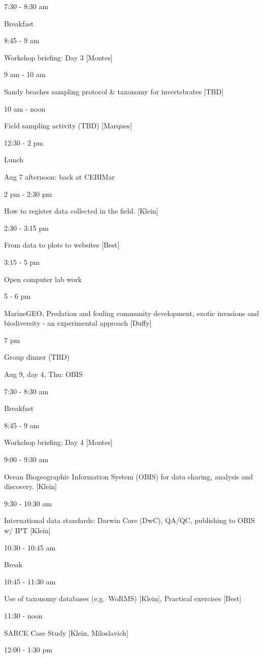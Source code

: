 \documentclass[]{book}
\theoremstyle{definition}
\theoremstyle{definition}
\theoremstyle{definition}
\theoremstyle{remark}
\begin{document}
7:30 - 8:30 am

Breakfast

8:45 - 9 am

Workshop briefing: Day 3 {[}Montes{]}

9 am - 10 am

Sandy beaches sampling protocol \& taxonomy for invertebrates {[}TBD{]}

10 am - noon

Field sampling activity (TBD) {[}Marques{]}

12:30 - 2 pm

Lunch

Aug 7 afternoon: back at CEBIMar

2 pm - 2:30 pm

How to register data collected in the field. {[}Klein{]}

2:30 - 3:15 pm

From data to plots to websites {[}Best{]}

3:15 - 5 pm

Open computer lab work

5 - 6 pm

MarineGEO, Predation and fouling community development, exotic invasions
and biodiversity - an experimental approach {[}Duffy{]}

7 pm

Group dinner (TBD)

Aug 9, day 4, Thu: OBIS

7:30 - 8:30 am

Breakfast

8:45 - 9 am

Workshop briefing: Day 4 {[}Montes{]}

9:00 - 9:30 am

Ocean Biogeographic Information System (OBIS) for data sharing, analysis
and discovery. {[}Klein{]}

9:30 - 10:30 am

International data standards: Darwin Core (DwC), QA/QC, publishing to
OBIS w/ IPT {[}Klein{]}

10:30 - 10:45 am

Break

10:45 - 11:30 am

Use of taxonomy databases (e.g.~WoRMS) {[}Klein{]}, Practical exercises
{[}Best{]}

11:30 - noon

SARCE Case Study {[}Klein, Miloslavich{]}

12:00 - 1:30 pm
\end{document}
